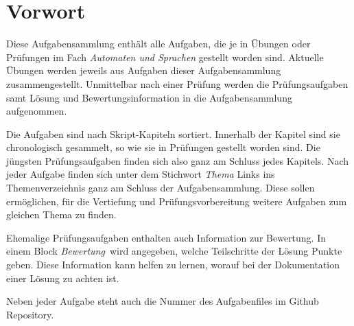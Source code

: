 %
%
%
\chapter*{Vorwort}
Diese Aufgabensammlung enthält alle Aufgaben, die je in Übungen oder
Prüfungen im Fach {\em Automaten und Sprachen} gestellt worden sind.
Aktuelle Übungen werden jeweils aus Aufgaben dieser Aufgabensammlung
zusammengestellt.
Unmittelbar nach einer Prüfung werden die Prüfungsaufgaben samt
Lösung und Bewertungsinformation in die Aufgabensammlung aufgenommen.

Die Aufgaben sind nach Skript-Kapiteln sortiert.
Innerhalb der Kapitel sind sie chronologisch gesammelt, so wie sie
in Prüfungen gestellt worden sind.
Die jüngsten Prüfungsaufgaben finden sich also ganz am Schluss jedes
Kapitels.
Nach jeder Aufgabe finden sich unter dem Stichwort {\em Thema} Links
ins Themenverzeichnis ganz am Schluss der Aufgabensammlung.
Diese sollen ermöglichen, für die Vertiefung und Prüfungsvorbereitung
weitere Aufgaben zum gleichen Thema zu finden.

Ehemalige Prüfungsaufgaben enthalten auch Information zur Bewertung.
In einem Block {\em Bewertung} wird angegeben, welche Teilschritte
der Lösung Punkte geben.
Diese Information kann helfen zu lernen, worauf bei der Dokumentation
einer Lösung zu achten ist.

Neben jeder Aufgabe steht auch die Nummer des Aufgabenfiles im
Github Repository.

